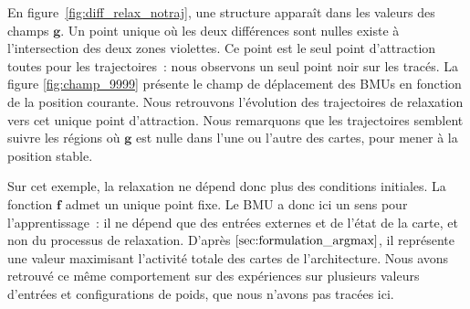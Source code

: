 \documentclass[../main]{subfiles}
\begin{document}
En figure~\ref{fig:diff_relax_notraj}, une structure apparaît dans les valeurs des champs $\mathbf{g}$.
Un point unique où les deux différences sont nulles existe à l'intersection des deux zones violettes. Ce point est le seul point d'attraction toutes pour les trajectoires~: nous observons un seul point noir sur les tracés.
La figure \ref{fig:champ_9999} présente le champ de déplacement des BMUs en fonction de la position courante. 
Nous retrouvons l'évolution des trajectoires de relaxation vers cet unique point d'attraction. Nous remarquons que les trajectoires semblent suivre les régions où $\mathbf{g}$ est nulle dans l'une ou l'autre des cartes, pour mener à la position stable. 

Sur cet exemple, la relaxation ne dépend donc plus des conditions initiales. La fonction $\mathbf{f}$ admet un unique point fixe. 
Le BMU a donc ici un sens pour l'apprentissage~: il ne dépend que des entrées externes et de l'état de la carte, et non du processus de relaxation. D'après $\ref{sec:formulation_argmax}$, il représente une valeur maximisant l'activité totale des cartes de l'architecture.
Nous avons retrouvé ce même comportement sur des expériences sur plusieurs valeurs d'entrées et configurations de poids, que nous n'avons pas tracées ici. 
\end{document}
